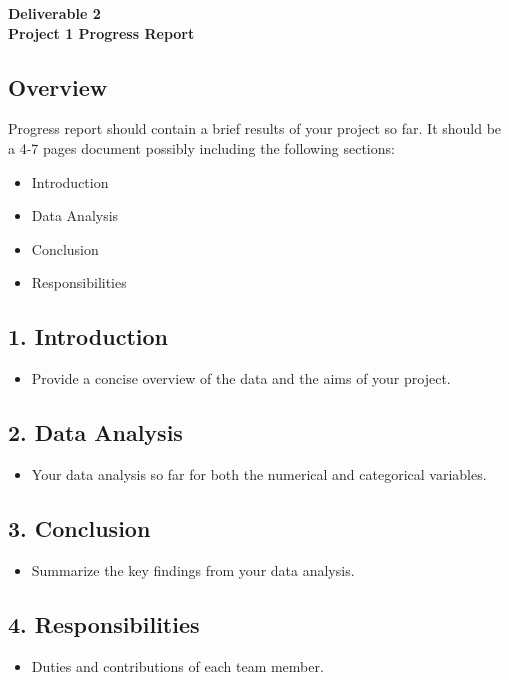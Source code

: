 \documentclass[12pt]{article}
\begin{document}
\begin{center}
\textbf{\Large Deliverable 2 \\ Project 1 Progress Report} 
\end{center}

\subsection*{Overview}
Progress report should contain a brief results of your project so far.
It should be a 4-7 pages document possibly including the following sections: 
\begin{itemize}
    \item Introduction
    \item Data Analysis
    \item Conclusion
    \item Responsibilities
\end{itemize}


\subsection*{1. Introduction}
\begin{itemize}
    \item Provide a concise overview of the data and the aims of your project.
\end{itemize}

\subsection*{2. Data Analysis}
\begin{itemize}
    \item Your data analysis so far for both the numerical and categorical variables.
\end{itemize}

\subsection*{3. Conclusion}
\begin{itemize}
    \item Summarize the key findings from your data analysis.
\end{itemize}

\subsection*{4. Responsibilities}
\begin{itemize}
    \item Duties and contributions of each team member.
\end{itemize}
\end{document}
